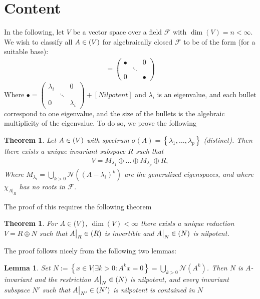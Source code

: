 \documentclass[10pt,twoside,openany,final]{memoir}
\theoremstyle{break}
\newtheorem{theorem}[section]{Theorem}
\newtheorem{lemma}[section]{Lemma}
\theoremstyle{Break}
\let\End\relax
\DeclareMathOperator{\End}{End}
\newcommand{\F}{\mathcal{F}}
\newcommand{\Nl}{\mathcal{N}}
\begin{document}
\section*{Content}
In the following, let $V$ be a vector space over a field $\F$ with $\dim(V)=n<\infty$. We wish to classify all $A \in \End(V)$ for algebraically closed $\F$ to be of the form (for a suitable base):
\begin{align*}
	[A]=\begin{pmatrix}
		\bullet &  &0 \\
		  &\ddots  &\\
		 0 & & \bullet
	\end{pmatrix}
\end{align*}
Where $\bullet=\begin{pmatrix}
	\lambda_i & & 0 \\
	& \ddots &\\
	0 & & \lambda_i
\end{pmatrix}+[Nilpotent]$ and $\lambda_i$ is an eigenvalue, and each bullet correspond to one eigenvalue, and the size of the bullets is the algebraic multiplicity of the eigenvalue. To do so, we prove the following
\begin{theorem}
	Let $A \in \End(V)$ with spectrum $\sigma(A) = \left\{ \lambda_1,\dots,\lambda_p \right\}$ (distinct). Then there exists a unique invariant subspace $R$ such that
	\begin{align*}
		V=M_{\lambda_1} \oplus \dots \oplus M_{\lambda_p} \oplus R,
	\end{align*}
	Where $M_{\lambda_i}=\bigcup_{k > 0} \Nl\left((A-\lambda_i)^k\right)$ are the generalized eigenspaces, and where $\chi_{A\big|_ R}$ has no roots in $\F$.
	\label{thm:58.2}
\end{theorem}
The proof of this requires the following theorem
\begin{theorem}
	For $A \in \End(V)$, $\dim(V) < \infty$ there exists a unique reduction $V= R \oplus N$ such that $A\big|_R \in \End(R)$ is invertible and $A\big|_N \in \End(N)$ is nilpotent.
	\label{thm:58.1}
\end{theorem}
The proof follows nicely from the following two lemmas:
\begin{lemma}
	Set $N:=\left\{ x \in V \big| \exists k > 0 : A^k x= 0 \right\}=\bigcup_{k > 0} \Nl(A^k)$. Then $N$ is $A$-invariant and the restriction $A\big|_N\in \End(N)$ is nilpotent, and every invariant subspace $N'$ such that $A\big|_{N'} \in \End(N')$ is nilpotent is contained in $N$  
\end{lemma}
\end{document}
